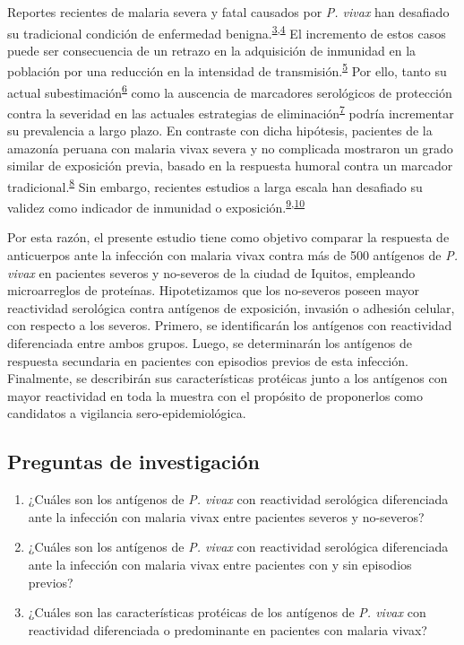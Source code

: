 \documentclass[]{article}
\begin{document}
Reportes recientes de malaria severa y fatal causados por \emph{P.
vivax} han desafiado su tradicional condición de enfermedad
benigna.\textsuperscript{\protect\hyperlink{ref-baird2009}{3},\protect\hyperlink{ref-quispe2014}{4}}
El incremento de estos casos puede ser consecuencia de un retrazo en la
adquisición de inmunidad en la población por una reducción en la
intensidad de
transmisión.\textsuperscript{\protect\hyperlink{ref-reyburn2015}{5}} Por
ello, tanto su actual
subestimación\textsuperscript{\protect\hyperlink{ref-llanoschea2015}{6}}
como la auscencia de marcadores serológicos de protección contra la
severidad en las actuales estrategias de
eliminación\textsuperscript{\protect\hyperlink{ref-accelerate2016}{7}}
podría incrementar su prevalencia a largo plazo. En contraste con dicha
hipótesis, pacientes de la amazonía peruana con malaria vivax severa y
no complicada mostraron un grado similar de exposición previa, basado en
la respuesta humoral contra un marcador
tradicional.\textsuperscript{\protect\hyperlink{ref-baldevi2013}{8}} Sin
embargo, recientes estudios a larga escala han desafiado su validez como
indicador de inmunidad o
exposición.\textsuperscript{\protect\hyperlink{ref-crompton2010}{9},\protect\hyperlink{ref-Helb2015exposure}{10}}

Por esta razón, el presente estudio tiene como objetivo comparar la
respuesta de anticuerpos ante la infección con malaria vivax contra más
de 500 antígenos de \emph{P. vivax} en pacientes severos y no-severos de
la ciudad de Iquitos, empleando microarreglos de proteínas.
Hipotetizamos que los no-severos poseen mayor reactividad serológica
contra antígenos de exposición, invasión o adhesión celular, con
respecto a los severos. Primero, se identificarán los antígenos con
reactividad diferenciada entre ambos grupos. Luego, se determinarán los
antígenos de respuesta secundaria en pacientes con episodios previos de
esta infección. Finalmente, se describirán sus características protéicas
junto a los antígenos con mayor reactividad en toda la muestra con el
propósito de proponerlos como candidatos a vigilancia
sero-epidemiológica.

\subsection{Preguntas de
investigación}\label{preguntas-de-investigacion}

\begin{enumerate}
\def\labelenumi{\arabic{enumi}.}
\item
  ¿Cuáles son los antígenos de \emph{P. vivax} con reactividad
  serológica diferenciada ante la infección con malaria vivax entre
  pacientes severos y no-severos?
\item
  ¿Cuáles son los antígenos de \emph{P. vivax} con reactividad
  serológica diferenciada ante la infección con malaria vivax entre
  pacientes con y sin episodios previos?
\item
  ¿Cuáles son las características protéicas de los antígenos de \emph{P.
  vivax} con reactividad diferenciada o predominante en pacientes con
  malaria vivax?
\end{enumerate}
\end{document}
